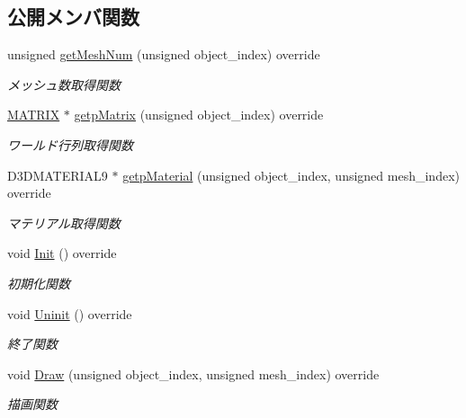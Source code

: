 \subsection*{公開メンバ関数}
\begin{DoxyCompactItemize}
\item 
unsigned \mbox{\hyperlink{class_enemy_draw_a1d8a943e4b625795bbd5ae614cc38ed1}{get\+Mesh\+Num}} (unsigned object\+\_\+index) override
\begin{DoxyCompactList}\small\item\em メッシュ数取得関数 \end{DoxyCompactList}\item 
\mbox{\hyperlink{_matrix_8h_a032295cd9fb1b711757c90667278e744}{M\+A\+T\+R\+IX}} $\ast$ \mbox{\hyperlink{class_enemy_draw_afbb8ac19041abda280ece7737103dc66}{getp\+Matrix}} (unsigned object\+\_\+index) override
\begin{DoxyCompactList}\small\item\em ワールド行列取得関数 \end{DoxyCompactList}\item 
D3\+D\+M\+A\+T\+E\+R\+I\+A\+L9 $\ast$ \mbox{\hyperlink{class_enemy_draw_a3f2885da84533364daaaac4a801fbc46}{getp\+Material}} (unsigned object\+\_\+index, unsigned mesh\+\_\+index) override
\begin{DoxyCompactList}\small\item\em マテリアル取得関数 \end{DoxyCompactList}\item 
void \mbox{\hyperlink{class_enemy_draw_aa1659c35fa757db6a6cf07e26ad9ddfb}{Init}} () override
\begin{DoxyCompactList}\small\item\em 初期化関数 \end{DoxyCompactList}\item 
void \mbox{\hyperlink{class_enemy_draw_a2861dc0623b0be7726bc69a6a469190e}{Uninit}} () override
\begin{DoxyCompactList}\small\item\em 終了関数 \end{DoxyCompactList}\item 
void \mbox{\hyperlink{class_enemy_draw_a20a23c1c5fd5e510d15e8ca27aabd821}{Draw}} (unsigned object\+\_\+index, unsigned mesh\+\_\+index) override
\begin{DoxyCompactList}\small\item\em 描画関数 \end{DoxyCompactList}\end{DoxyCompactItemize}
